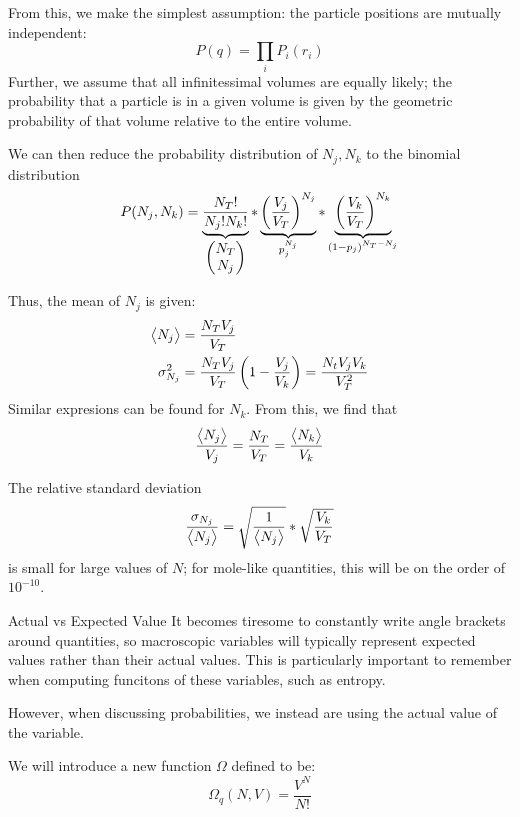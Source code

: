 From this, we make the simplest assumption: the particle positions are mutually independent:
\[P(q)=\prod_i P_i(r_i)\]
Further, we assume that all infinitessimal volumes are equally likely; the probability that a particle is in a given volume is given by the geometric probability of that volume relative to the entire volume.

We can then reduce the probability distribution of \(N_j, N_k\) to the binomial distribution
\begin{equation}P(N_j,N_k)=\underbrace{\frac{N_T!}{N_j!N_k!}}_{\begin{pmatrix}N_T\\N_j\end{pmatrix}}*\underbrace{\left(\frac{V_j}{V_T}\right)^{N_j}}_{p_j^{N_j}}*\underbrace{\left(\frac{V_k}{V_T}\right)^{N_k}}_{(1-p_j)^{N_T-N_j}}\label{eq4:confprob}\end{equation}

Thus, the mean of \(N_j\) is given:
\begin{subequations}
	\begin{align}
		\left\langle \begin{matrix}N_j\end{matrix} \right\rangle&=\frac{N_T V_j}{V_T}\\
		\sigma_{N_j}^2&=\frac{N_T V_j}{V_T}\left(1-\frac{V_j}{V_k}\right)=\frac{N_t V_j V_k}{V_T^2}
	\end{align}
\end{subequations}
Similar expresions can be found for \(N_k\). From this, we find that
\begin{equation}
	\frac{\left\langle \begin{matrix}N_j\end{matrix} \right\rangle}{V_j}=\frac{N_T}{V_T}=\frac{\left\langle \begin{matrix}N_k\end{matrix} \right\rangle}{V_k}
\end{equation}

The relative standard deviation
\[\frac{\sigma_{N_j}}{\left\langle \begin{matrix}N_j\end{matrix} \right\rangle}=\sqrt{\frac{1}{\left\langle \begin{matrix}N_j\end{matrix} \right\rangle}}*\sqrt{\frac{V_k}{V_T}}\]
is small for large values of \(N\); for mole-like quantities, this will be on the order of \(10^{-10}\).

\begin{aside}{Actual vs Expected Value}
	It becomes tiresome to constantly write angle brackets around quantities, so macroscopic variables will typically represent expected values rather than their actual values. This is particularly important to remember when computing funcitons of these variables, such as entropy.

	However, when discussing probabilities, we instead are using the actual value of the variable.
\end{aside}

We will introduce a new function \(\Omega\) defined to be:
\begin{equation}
	\Omega_q(N,V)=\frac{V^N}{N!}
\end{equation}

